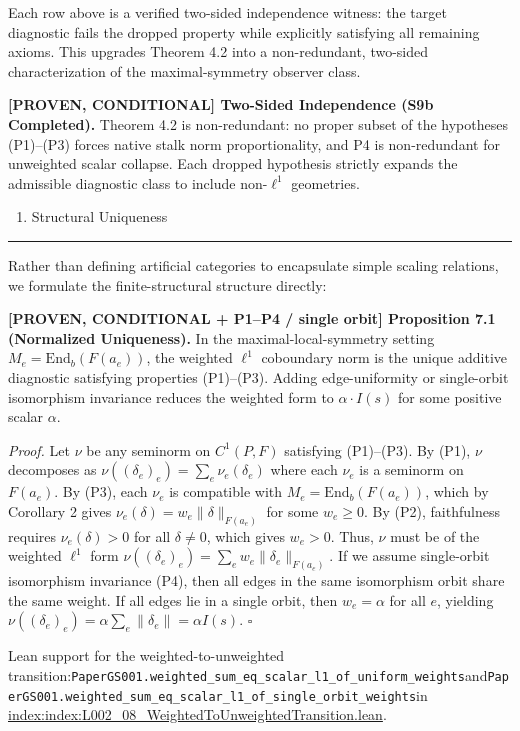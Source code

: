\documentclass[
  11pt,
]{article}
\providecommand{\tightlist}{%
  \setlength{\itemsep}{0pt}\setlength{\parskip}{0pt}}
\providecommand{\tightlist}{%
  \setlength{\itemsep}{0pt}\setlength{\parskip}{0pt}}
\renewenvironment{quote}
  {\begin{leftbar}\small}
  {\end{leftbar}}
\begin{document}
Each row above is a verified two-sided independence witness: the target diagnostic fails the dropped property while explicitly satisfying all remaining axioms. This upgrades Theorem 4.2 into a non-redundant, two-sided characterization of the maximal-symmetry observer class.

\begin{quote}
\textbf{{[}PROVEN, CONDITIONAL{]} Two-Sided Independence (S9b Completed).} Theorem 4.2 is non-redundant: no proper subset of the hypotheses (P1)--(P3) forces native stalk norm proportionality, and P4 is non-redundant for unweighted scalar collapse. Each dropped hypothesis strictly expands the admissible diagnostic class to include non-\(\ell^1\) geometries.
\end{quote}

\begin{enumerate}
\def\labelenumi{\arabic{enumi}.}
\setcounter{enumi}{6}
\tightlist
\item
  Structural Uniqueness
\end{enumerate}

\begin{center}\rule{0.5\linewidth}{0.5pt}\end{center}

Rather than defining artificial categories to encapsulate simple scaling relations, we formulate the finite-structural structure directly:

\begin{quote}
\textbf{{[}PROVEN, CONDITIONAL + P1--P4 / single orbit{]} Proposition 7.1 (Normalized Uniqueness).} In the maximal-local-symmetry setting \(M_e=\mathrm{End}_b(F(a_e))\), the weighted \(\ell^1\) coboundary norm is the unique additive diagnostic satisfying properties (P1)--(P3). Adding edge-uniformity or single-orbit isomorphism invariance reduces the weighted form to \(\alpha\cdot I(s)\) for some positive scalar \(\alpha\).

\emph{Proof.} Let \(\nu\) be any seminorm on \(C^1(P, F)\) satisfying (P1)--(P3). By (P1), \(\nu\) decomposes as \(\nu((\delta_e)_e) = \sum_e \nu_e(\delta_e)\) where each \(\nu_e\) is a seminorm on \(F(a_e)\).
By (P3), each \(\nu_e\) is compatible with \(M_e = \mathrm{End}_b(F(a_e))\), which by Corollary 2 gives \(\nu_e(\delta) = w_e \|\delta\|_{F(a_e)}\) for some \(w_e \geq 0\).
By (P2), faithfulness requires \(\nu_e(\delta) > 0\) for all \(\delta \neq 0\), which gives \(w_e > 0\). Thus, \(\nu\) must be of the weighted \(\ell^1\) form \(\nu((\delta_e)_e) = \sum_e w_e \|\delta_e\|_{F(a_e)}\).
If we assume single-orbit isomorphism invariance (P4), then all edges in the same isomorphism orbit share the same weight. If all edges lie in a single orbit, then \(w_e = \alpha\) for all \(e\), yielding \(\nu((\delta_e)_e) = \alpha \sum_e \|\delta_e\| = \alpha I(s).\) \(\square\)

Lean support for the weighted-to-unweighted transition:\texttt{PaperGS001.weighted\_sum\_eq\_scalar\_l1\_of\_uniform\_weights}and\texttt{PaperGS001.weighted\_sum\_eq\_scalar\_l1\_of\_single\_orbit\_weights}in
\href{\%60estate\%20index\%20(see\%20claim\%20ledger;\%20monorepo\%20path\%20omitted\%20for\%20release)\%60}{index:index:L002\_08\_WeightedToUnweightedTransition.lean}.
\end{quote}
\end{document}

